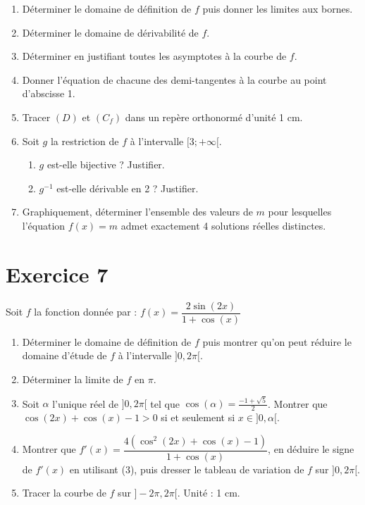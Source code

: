\documentclass[12pt,a4paper]{article}
\begin{document}
\begin{enumerate}
    \item Déterminer le domaine de définition de $f$ puis donner les limites aux bornes.
    \item Déterminer le domaine de dérivabilité de $f$.
    \item Déterminer en justifiant toutes les asymptotes à la courbe de $f$.
    \item Donner l'équation de chacune des demi-tangentes à la courbe au point d'abscisse 1.
    \item Tracer $(D)$ et $(C_f)$ dans un repère orthonormé d'unité 1 cm.
    \item Soit $g$ la restriction de $f$ à l'intervalle $[3; +\infty[$.
    \begin{enumerate}
        \item $g$ est-elle bijective ? Justifier.
        \item $g^{-1}$ est-elle dérivable en 2 ? Justifier.
    \end{enumerate}
    \item Graphiquement, déterminer l'ensemble des valeurs de $m$ pour lesquelles l'équation $f(x) = m$ admet exactement 4 solutions réelles distinctes.
\end{enumerate}
\section*{Exercice 7}

Soit $f$ la fonction donnée par : $f(x) = \dfrac{2 \sin(2x)}{1 + \cos(x)}$

\begin{enumerate}
    \item Déterminer le domaine de définition de $f$ puis montrer qu’on peut réduire le domaine d’étude de $f$ à l’intervalle $]0, 2\pi[$.
    \item Déterminer la limite de $f$ en $\pi$.
    \item Soit $\alpha$ l’unique réel de $]0, 2\pi[$ tel que $\cos(\alpha) = \frac{-1 + \sqrt{5}}{2}$. Montrer que $\cos(2x) + \cos(x) - 1 > 0$ si et seulement si $x \in ]0, \alpha[$.
    \item Montrer que $f'(x) = \dfrac{4( \cos^2(2x) + \cos(x) - 1)}{1 + \cos(x)}$, en déduire le signe de $f'(x)$ en utilisant (3), puis dresser le tableau de variation de $f$ sur $]0, 2\pi[$.
    \item Tracer la courbe de $f$ sur $]-2\pi, 2\pi[$. Unité : 1 cm.
\end{enumerate}
\end{document}
